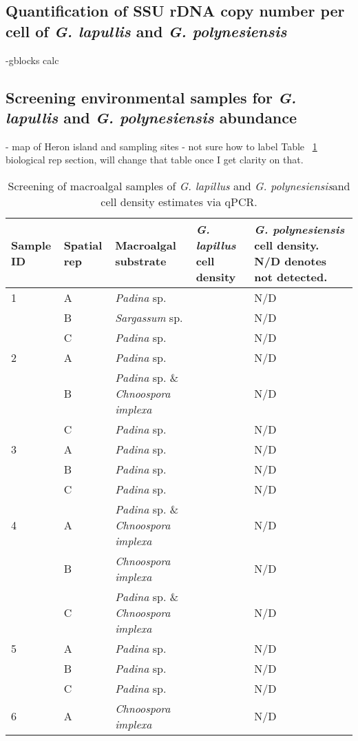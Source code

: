 \documentclass[12pt]{article}
\begin{document}
\subsection{Quantification of SSU rDNA copy number per cell of \emph{G. lapullis} and \emph{G. polynesiensis}}
-gblocks calc
\subsection{Screening environmental samples for \emph{G. lapullis} and \emph{G. polynesiensis} abundance}
- map of Heron island and sampling sites
- not sure how to label Table ~\ref{tbl:MacroalgaeTable} biological rep section, will change that table once I get clarity on that.
\FloatBarrier
\begin{longtable}{ | p{1cm} | p{1cm} | p{3cm} | p{4cm} | p{4cm} | }
\caption{Screening of macroalgal samples of \emph{G. lapillus} and \emph{G. polynesiensis}and cell density estimates via qPCR.}\\
\hline
\label{tbl:MacroalgaeTable}
\textbf{Sample ID}&\textbf{Spatial rep}&\textbf{Macroalgal substrate}&\textbf{\textit{G. lapillus} cell density}&\textbf{\textit{G. polynesiensis} cell density. N/D denotes not detected.}\\
\hline
1&A&\emph{Padina} sp.&&N/D\\
\hline
&B&\emph{Sargassum} sp.&&N/D\\
\hline
&C&\emph{Padina} sp.&&N/D\\
\hline
2&A&\emph{Padina} sp.&&N/D\\
\hline
&B&\emph{Padina} sp. \& \emph{Chnoospora implexa}&&N/D\\
\hline
&C&\emph{Padina} sp.&&N/D\\
\hline
3&A&\emph{Padina} sp.&&N/D\\
\hline
&B&\emph{Padina} sp.&&N/D\\
\hline
&C&\emph{Padina} sp.&&N/D\\
\hline
4&A&\emph{Padina} sp. \& \emph{Chnoospora implexa}&&N/D\\
\hline
&B&\emph{Chnoospora implexa}&&N/D\\
\hline
&C&\emph{Padina} sp. \& \emph{Chnoospora implexa}&&N/D\\
\hline
5&A&\emph{Padina} sp.&&N/D\\
\hline
&B&\emph{Padina} sp.&&N/D\\
\hline
&C&\emph{Padina} sp.&&N/D\\
\hline
6&A&\emph{Chnoospora implexa}&&N/D\\
\hline

\end{longtable}
\end{document}
